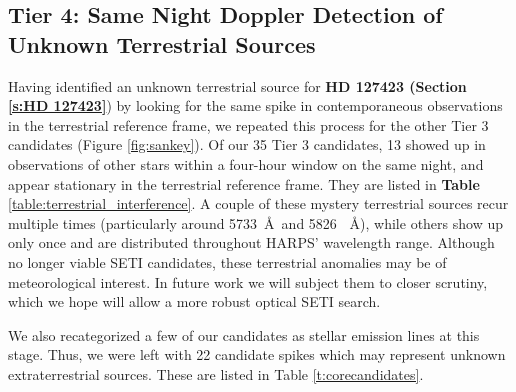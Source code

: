 \documentclass[linenumbers]{aastex701}
\providecommand{\DIFadd}[1]{{\bf #1}} %
\providecommand{\DIFaddbegin}{} %
\providecommand{\DIFaddend}{} %
\begin{document}
\subsection{Tier 4:  \DIFaddbegin \DIFadd{Same Night }\DIFaddend Doppler Detection of Unknown Terrestrial Sources}
\label{s:doppler}
Having identified an unknown terrestrial source for  \DIFaddbegin \DIFadd{HD 127423 (Section \ref{s:HD 127423}}\DIFaddend ) by looking for the same spike in contemporaneous observations in the terrestrial reference frame,  we repeated this process for the other Tier 3 candidates (Figure \ref{fig:sankey}). Of our 35 Tier 3 candidates, 13 showed up in observations of other stars within a four-hour window on the same night, and appear stationary in the terrestrial reference frame. They are listed in \DIFaddbegin \DIFadd{Table }\DIFaddend \ref{table:terrestrial_interference}. A couple of these mystery terrestrial sources recur multiple times (particularly around 5733~\AA~and 5826 \DIFaddbegin \DIFadd{~}\DIFaddend \AA), while others show up only once and are distributed throughout HARPS' wavelength range. Although no longer viable SETI candidates, these terrestrial anomalies may be of meteorological interest. In future work we will subject them to closer scrutiny, which we hope will allow a more robust optical SETI search.

We also recategorized a few of our candidates as stellar emission lines at this stage.  Thus, we were left with 22 candidate spikes which may represent unknown extraterrestrial sources.  These are listed in Table \ref{t:corecandidates}.
\end{document}
